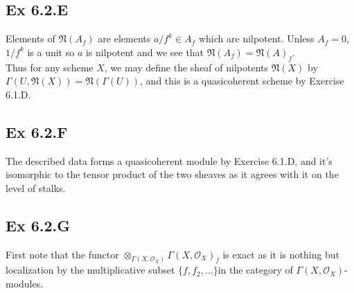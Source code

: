 \documentclass{article}
\theoremstyle{definition}
\begin{document}
\subsection*{Ex 6.2.E}

Elements of $\mathfrak{N}(A_f)$ are elements $a/f^{k} \in A_f$ which are
nilpotent. Unless $A_f = 0$, $1/f^{k}$ is a unit so $a$ is nilpotent and we see
that $\mathfrak{N}(A_f) = \mathfrak{N}(A)_f$. \\

Thus for any scheme $X$, we may define the sheaf of nilpotents
$\mathfrak{N}(X)$ by $\Gamma(U, \mathfrak{N}(X)) = \mathfrak{N}(\Gamma(U))$,
and this is a quasicoherent scheme by Exercise 6.1.D.

\subsection*{Ex 6.2.F}

The described data forms a quasicoherent module by Exercise 6.1.D, and it's
isomorphic to the tensor product of the two sheaves as it agrees with it on the
level of stalks.

\subsection*{Ex 6.2.G}

First note that the functor $\otimes_{\Gamma(X, \mathcal{O}_X)} \Gamma(X,
	\mathcal{O}_X)_f$ is exact as it is nothing but localization by the
multiplicative subset $\{f,f_{2},\ldots\}$in the category of $\Gamma(X,
	\mathcal{O}_X)$-modules. \\
\end{document}
